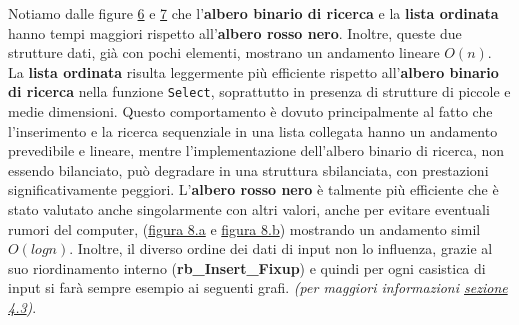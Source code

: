\documentclass[10pt]{article}
\begin{document}
\noindent Notiamo dalle figure \hyperref[confronto-select-random]{6} e \hyperref[fig:confronto-rank-random]{7} che l'\textbf{albero binario di ricerca} e la \textbf{lista ordinata} hanno tempi maggiori rispetto all'\textbf{albero rosso nero}. Inoltre, queste due strutture dati, già con pochi elementi, mostrano un andamento lineare $O(n)$. La \textbf{lista ordinata} risulta leggermente più efficiente rispetto all'\textbf{albero binario di ricerca} nella funzione \texttt{Select}, soprattutto in presenza di strutture di piccole e medie dimensioni. Questo comportamento è dovuto principalmente al fatto che l'inserimento e la ricerca sequenziale in una lista collegata hanno un andamento prevedibile e lineare, mentre l'implementazione dell'albero binario di ricerca, non essendo bilanciato, può degradare in una struttura sbilanciata, con prestazioni significativamente peggiori.\newline 
L'\textbf{albero rosso nero} è talmente più efficiente che è stato valutato anche singolarmente con altri valori, anche per evitare eventuali rumori del computer, (\hyperref[select-rn]{figura 8.a} e \hyperref[rank-rn]{figura 8.b}) mostrando un andamento simil $O(logn)$. Inoltre, il diverso ordine dei dati di input non lo influenza, grazie al suo riordinamento interno (\textbf{rb\_Insert\_Fixup}) e quindi per ogni casistica di input si farà sempre esempio ai seguenti grafi.
\textit{(per maggiori informazioni \hyperref[approfondimenti]{sezione 4.3})}.
\end{document}
